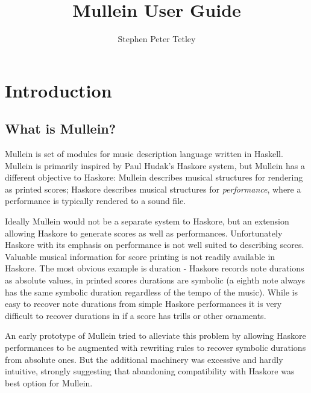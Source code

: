 \documentclass{article}
\begin{document}
\author{Stephen Peter Tetley}
\title{Mullein User Guide}
\maketitle
\tableofcontents

\section{Introduction}
\subsection{What is Mullein?}
Mullein is set of modules for music description language written 
in Haskell. Mullein is primarily inspired by Paul Hudak's 
Haskore system, but Mullein has a different objective to Haskore: 
Mullein describes musical structures for rendering as printed 
scores; Haskore describes musical structures for 
\emph{performance}, where a performance is typically rendered to 
a sound file. 

Ideally Mullein would not be a separate system to Haskore, but
an extension allowing Haskore to generate scores as well 
as performances. Unfortunately Haskore with its emphasis on 
performance is not well suited to describing scores. Valuable
musical information for score printing is not readily available
in Haskore. The most obvious example is duration - Haskore 
records note durations as absolute values, in printed scores 
durations are symbolic (a eighth note always has the same 
symbolic duration  regardless of the tempo 
of the music). While is easy to recover note durations from 
simple Haskore performances it is very difficult to recover 
durations in if a score has trills or other ornaments.

An early prototype of Mullein tried to alleviate this problem 
by allowing Haskore performances to be augmented with rewriting 
rules to recover symbolic durations from absolute ones. But the 
additional machinery was excessive and hardly intuitive, 
strongly suggesting that abandoning compatibility with Haskore
was best option for Mullein.

\begin{comment}

unit note length

pitch relative to scale 

Mullein represents durations symbolically... 
\begin{alltt} 
longa, breve, \nicefrac{1}{1}, \nicefrac{1}{2}, \nicefrac{1}{4},
\nicefrac{1}{8}, \nicefrac{1}{16}
\end{alltt}
\end{comment}
\end{document}
